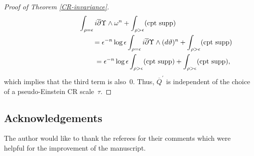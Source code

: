 \documentclass[10pt,a4paper]{amsart}
\numberwithin{equation}{section}
\begin{document}
\begin{proof}[Proof of Theorem \ref{CR-invariance}]
\begin{gather*}
\int_{\rho=\epsilon} i\overline{\partial}\Upsilon\wedge \omega^n+\int_{\rho>\epsilon} ({\rm cpt\ supp}) \\
\hphantom{\int_{\rho>\epsilon} i\partial\log\rho\wedge \overline{\partial}\Upsilon\wedge \omega^n}{}
 =\epsilon^{-n}\log\epsilon\int_{\rho=\epsilon} i\overline{\partial}\Upsilon\wedge (d\vartheta)^n+\int_{\rho>\epsilon} ({\rm cpt\ supp}) \\
 \hphantom{\int_{\rho>\epsilon} i\partial\log\rho\wedge \overline{\partial}\Upsilon\wedge \omega^n}{}
 =\epsilon^{-n}\log\epsilon\int_{\rho>\epsilon} ({\rm cpt\ supp})+\int_{\rho>\epsilon} ({\rm cpt\ supp}),
\end{gather*}
which implies that the third term is also~0. Thus, $\overline{Q}^\prime$ is independent of the choice of a pseudo-Einstein CR scale~$\tau$.\end{proof}

\subsection*{Acknowledgements}

The author would like to thank the referees for their comments which were helpful for the improvement of the manuscript.

\end{document}
